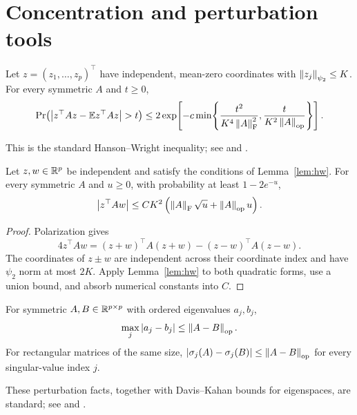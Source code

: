\section{Concentration and perturbation tools}\label{sec:tools}
\begin{lemma}\label{lem:hw}
Let $z=(z_1,\ldots,z_p)^\top$ have independent, mean-zero coordinates with $\left\lVert z_j\right\rVert_{\psi_2}\le K$.  For every symmetric $A$ and $t\ge0$,
\begin{equation}
\Pr\!\left(\left\lvert z^\top Az-\mathbb{E}z^\top Az\right\rvert>t\right)
\le2\exp\!\left[-c\min\!\left\{\frac{t^2}{K^4\left\lVert A\right\rVert_{\mathrm{F}}^2},\frac{t}{K^2\left\lVert A\right\rVert_{\mathrm{op}}}\right\}\right].
\end{equation}
\end{lemma}
This is the standard Hanson--Wright inequality; see \citet{RudelsonVershynin2013} and \citet{HsuKakadeZhang2012}.

\begin{lemma}\label{lem:bilinear}
Let $z,w\in\mathbb{R}^p$ be independent and satisfy the conditions of Lemma~\ref{lem:hw}.  For every symmetric $A$ and $u\ge0$, with probability at least $1-2e^{-u}$,
\begin{equation}\label{eq:bilinear}
\left\lvert z^\top Aw\right\rvert\le CK^2\left(\left\lVert A\right\rVert_{\mathrm{F}}\sqrt{u}+\left\lVert A\right\rVert_{\mathrm{op}}u\right).
\end{equation}
\end{lemma}
\begin{proof}
Polarization gives
\begin{equation}
4z^\top Aw=(z+w)^\top A(z+w)-(z-w)^\top A(z-w).
\end{equation}
The coordinates of $z\pm w$ are independent across their coordinate index and have $\psi_2$ norm at most $2K$.  Apply Lemma~\ref{lem:hw} to both quadratic forms, use a union bound, and absorb numerical constants into $C$.
\end{proof}

\begin{lemma}\label{lem:weyl}
For symmetric $A,B\in\mathbb{R}^{p\times p}$ with ordered eigenvalues $a_j,b_j$,
\begin{equation}
\max_j\left\lvert a_j-b_j\right\rvert\le\left\lVert A-B\right\rVert_{\mathrm{op}}.
\end{equation}
For rectangular matrices of the same size, $\left\lvert\sigma_j(A)-\sigma_j(B)\right\rvert\le\left\lVert A-B\right\rVert_{\mathrm{op}}$ for every singular-value index $j$.
\end{lemma}
These perturbation facts, together with Davis--Kahan bounds for eigenspaces, are standard; see \citet{StewartSun1990} and \citet{YuWangSamworth2015}.
